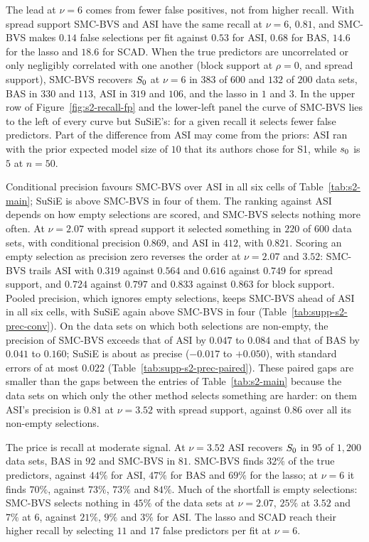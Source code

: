 The lead at $\nu=6$ comes from fewer false positives, not from higher recall. With spread support SMC-BVS and ASI
have the same recall at $\nu=6$, $0.81$, and SMC-BVS makes $0.14$ false selections per fit against $0.53$ for ASI,
$0.68$ for BAS, $14.6$ for the lasso and $18.6$ for SCAD. When the true predictors are uncorrelated or only negligibly
correlated with one another (block support at $\rho=0$, and spread support), SMC-BVS recovers $S_0$ at $\nu=6$ in $383$ of $600$ and $132$ of
$200$ data sets, BAS in $330$ and $113$, ASI in $319$ and $106$, and the lasso in $1$ and $3$. In the upper row of
Figure~\ref{fig:s2-recall-fp} and the lower-left panel the curve of SMC-BVS lies to the left of every curve but
SuSiE's: for a given recall it selects fewer false predictors. Part of the difference from ASI may come from the
priors: ASI ran with the prior expected model size of $10$ that its authors chose for S1, while $s_0$ is $5$ at $n=50$.

Conditional precision favours SMC-BVS over ASI in all six cells of Table~\ref{tab:s2-main}; SuSiE is above
SMC-BVS in four of them. The ranking against ASI depends on how empty selections are scored, and SMC-BVS selects nothing more often. At $\nu=2.07$ with spread support it selected
something in $220$ of $600$ data sets, with conditional precision $0.869$, and ASI in $412$, with $0.821$. Scoring an
empty selection as precision zero reverses the order at $\nu=2.07$ and $3.52$: SMC-BVS trails ASI with $0.319$
against $0.564$ and $0.616$ against $0.749$ for spread support, and $0.724$ against $0.797$ and $0.833$ against $0.863$
for block support. Pooled precision, which ignores empty selections, keeps SMC-BVS ahead of ASI in all six
cells, with SuSiE again above SMC-BVS in four (Table~\ref{tab:supp-s2-prec-conv}). On the data sets on which both selections are non-empty, the precision of
SMC-BVS exceeds that of ASI by $0.047$ to $0.084$ and that of BAS by $0.041$ to $0.160$; SuSiE is about as precise
($-0.017$ to $+0.050$), with standard errors of at most $0.022$ (Table~\ref{tab:supp-s2-prec-paired}). These paired
gaps are smaller than the gaps between the entries of Table~\ref{tab:s2-main} because the data sets on which only the
other method selects something are harder: on them ASI's precision is $0.81$ at $\nu=3.52$ with spread support,
against $0.86$ over all its non-empty selections.

The price is recall at moderate signal. At $\nu=3.52$ ASI recovers $S_0$ in $95$ of $1{,}200$ data sets, BAS in $92$
and SMC-BVS in $81$. SMC-BVS finds $32\%$ of the true predictors, against $44\%$ for ASI, $47\%$ for BAS and $69\%$ for
the lasso; at $\nu=6$ it finds $70\%$, against $73\%$, $73\%$ and $84\%$. Much of the shortfall is empty selections:
SMC-BVS selects nothing in $45\%$ of the data sets at $\nu=2.07$, $25\%$ at $3.52$ and $7\%$ at $6$, against $21\%$,
$9\%$ and $3\%$ for ASI. The lasso and SCAD reach their higher recall by selecting $11$ and $17$ false predictors per
fit at $\nu=6$.

